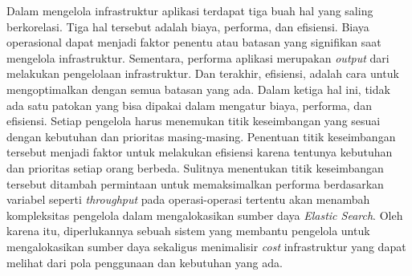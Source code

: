 Dalam mengelola infrastruktur aplikasi terdapat tiga buah hal yang saling berkorelasi. Tiga hal tersebut adalah biaya, performa, dan efisiensi. Biaya operasional dapat menjadi faktor penentu atau batasan yang signifikan saat mengelola infrastruktur. Sementara, performa aplikasi merupakan \textit{output} dari melakukan pengelolaan infrastruktur. Dan terakhir, efisiensi, adalah cara untuk mengoptimalkan dengan semua batasan yang ada. Dalam ketiga hal ini, tidak ada satu patokan yang bisa dipakai dalam mengatur biaya, performa, dan efisiensi. Setiap pengelola harus menemukan titik keseimbangan yang sesuai dengan kebutuhan dan prioritas masing-masing. Penentuan titik keseimbangan tersebut menjadi faktor untuk melakukan efisiensi karena tentunya kebutuhan dan prioritas setiap orang berbeda. Sulitnya menentukan titik keseimbangan tersebut ditambah permintaan untuk memaksimalkan performa berdasarkan variabel seperti \textit{throughput} pada operasi-operasi tertentu akan menambah kompleksitas pengelola dalam mengalokasikan sumber daya \textit{Elastic Search}. Oleh karena itu, diperlukannya sebuah sistem yang membantu pengelola untuk mengalokasikan sumber daya sekaligus menimalisir \textit{cost} infrastruktur yang dapat melihat dari pola penggunaan dan kebutuhan yang ada.